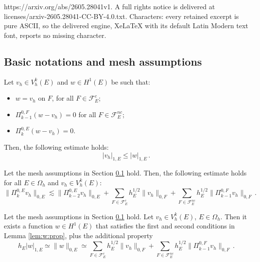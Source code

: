 \documentclass[10pt,a4paper]{amsart}
\newcommand{\PiZeroE}{\Pi^{0,E}_k}
\begin{document}
https://arxiv.org/abs/2605.28041v1. A full rights notice is delivered at licenses/arxiv-2605.28041-CC-BY-4.0.txt. Characters: every retained excerpt is pure ASCII, so the delivered engine, XeLaTeX with its default Latin Modern text font, reports no missing character.
\subsection{Basic notations and mesh assumptions}\label{sec:mesh-ass}

\begin{lemma}\label{lem:w:prop}
Let $v_h \in V^k_h(E)$ and $w \in H^1(E)$ be such that:
\begin{itemize}
    \item $w = v_h$ on $F$, for all $F \in \mathcal{F}^c_E$;
    \item $\Pi^{0,F}_{k-1}(w - v_h) = 0$ for all $F \in \mathcal{F}^{nc}_E$;
    \item $\PiZeroE(w -v_h) = 0$.
\end{itemize}
Then, the following estimate holds:
\[
| v_h |_{1,E} \leq | w |_{1,E} \, .
\]
\end{lemma}

\begin{corollary}\label{cor:easy}
Let the mesh assumptions in Section \ref{sec:mesh-ass} hold. 
Then, the following estimate holds for all $E \in \Omega_h$ and $v_h \in V_h^k(E)$:
\begin{equation}
\| \PiZeroE v_h \|_{0,E}
\lesssim
\| \Pi^{0,E}_{k-2} v_h \|_{0,E}
+ \sum_{F \in \mathcal{F}^{c}_E} h_E^{1/2} \| v_h \|_{0,F}
+ \sum_{F \in \mathcal{F}^{nc}_E} h_E^{1/2} \| \Pi^{0,F}_{k-1} v_h \|_{0,F} \, .
\end{equation}
\end{corollary}

\begin{lemma}\label{lm:beiraos-lemma}
Let the mesh assumptions in Section \ref{sec:mesh-ass} hold.
Let $v_h \in V_h^k(E)$, $E \in \Omega_h$. Then it exists a function $w \in H^1(E)$ that satisfies the first and second conditions in Lemma \ref{lem:w:prop}, plus the additional property
\begin{equation}\label{eq:equiv:br}
h_E |w|_{1,E} \simeq \| w \|_{0,E} \simeq \sum_{F \in \mathcal{F}^{c}_E} h_E^{1/2} \| v_h \|_{0,F}
+ \sum_{F \in \mathcal{F}^{nc}_E} h_E^{1/2} \| \Pi^{0,F}_{k-1} v_h \|_{0,F}  \, .
\end{equation}
\end{lemma}
\end{document}
